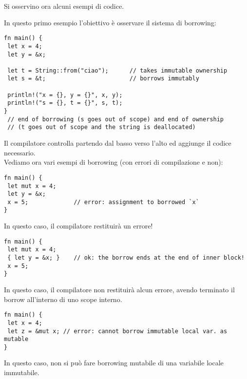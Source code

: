 \documentclass{article}
\begin{document}
Si osservino ora alcuni esempi di codice.

\pagebreak

In questo primo esempio l'obiettivo è osservare il sistema di borrowing:
\begin{tcolorbox}
\begin{verbatim}
fn main() {
 let x = 4;
 let y = &x;

 let t = String::from("ciao");      // takes immutable ownership
 let s = &t;                        // borrows immutably

 println!("x = {}, y = {}", x, y);
 println!("s = {}, t = {}", s, t);
} 
 // end of borrowing (s goes out of scope) and end of ownership 
 // (t goes out of scope and the string is deallocated)
\end{verbatim}
\end{tcolorbox}
Il compilatore controlla partendo dal basso verso l'alto ed aggiunge il codice necessario.\vspace{14pt}\\
Vediamo ora vari esempi di borrowing (con errori di compilazione e non):
\begin{tcolorbox}
\begin{verbatim}
fn main() {
 let mut x = 4;
 let y = &x;
 x = 5;             // error: assignment to borrowed `x`
}
\end{verbatim}
\end{tcolorbox}
In questo caso, il compilatore restituirà un errore!\vspace{8pt}

\begin{tcolorbox}
\begin{verbatim}
fn main() {
 let mut x = 4;
 { let y = &x; }    // ok: the borrow ends at the end of inner block!
 x = 5;
}
\end{verbatim}
\end{tcolorbox}
In questo caso, il compilatore non restituirà alcun errore, avendo terminato il borrow all'interno di uno scope interno.\vspace{8pt}

\begin{tcolorbox}
\begin{verbatim}
fn main() {
 let x = 4;
 let z = &mut x; // error: cannot borrow immutable local var. as mutable
}
\end{verbatim}
\end{tcolorbox}
In questo caso, non si può fare borrowing mutabile di una variabile locale immutabile.
\end{document}

